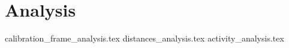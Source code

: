 \section{Analysis}

{calibration_frame_analysis.tex}
\clearpage
{distances_analysis.tex}
\clearpage
{activity_analysis.tex}